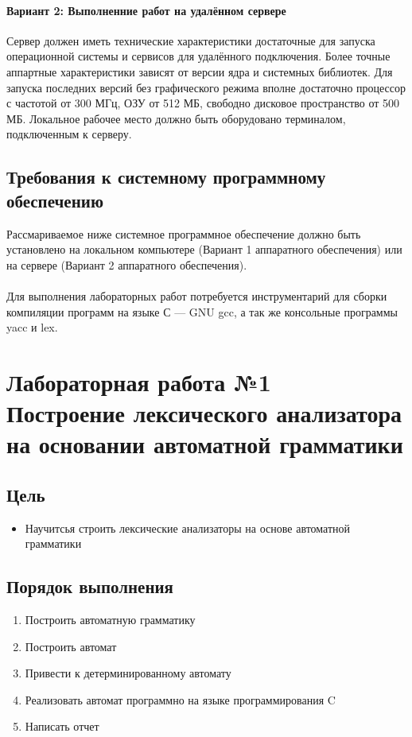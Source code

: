 \documentclass[a4paper,12pt]{article}
\begin{document}
\paragraph{Вариант 2: Выполненние работ на удалённом сервере}
Сервер должен иметь технические характеристики достаточные для запуска операционной системы и сервисов для удалённого подключения. Более точные аппартные характеристики зависят от версии ядра и системных библиотек. Для запуска последних версий без графического режима вполне достаточно процессор с частотой от 300 МГц, ОЗУ от 512 МБ, свободно дисковое пространство от 500 МБ. Локальное рабочее место должно быть оборудовано терминалом, подключенным к серверу.

\subsection{Требования к системному программному обеспечению}
Рассмариваемое ниже системное программное обеспечение должно быть установлено на локальном компьютере (Вариант 1 аппаратного обеспечения) или на сервере (Вариант 2 аппаратного обеспечения).
\paragraph{}
Для выполнения лабораторных работ потребуется инструментарий для сборки компиляции программ на языке С — GNU gcc, а так же консольные программы yacc и lex.

\newpage
\section{Лабораторная работа №1\\
	Построение лексического анализатора на основании автоматной грамматики}
\subsection{Цель}
\begin{itemize}
	\item Научитсья строить лексические анализаторы на основе автоматной грамматики
\end{itemize}

\subsection{Порядок выполнения}
\begin{enumerate}
	\item Построить автоматную грамматику
	\item Построить автомат
	\item Привести к детерминированному автомату
	\item Реализовать автомат программно на языке программирования C
	\item Написать отчет
\end{enumerate}
\end{document}
